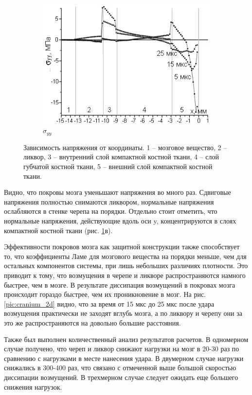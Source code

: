 \begin{figure}[h]
\begin{subfigure}[b]{0.6\textwidth}
\includegraphics[width=\textwidth]{png/cranium/2d-syy-1d.png}
\caption{$\sigma_{yy}$}
\end{subfigure}
\caption{Зависимость напряжения от координаты. 1 -- мозговое вещество, 2 -- ликвор, 3 -- внутренний слой компактной костной ткани, 4 -- слой губчатой костной ткани, 5 -- внешний слой компактной костной ткани.}
\label{pic:cranium_2d_1d}
\end{figure}

Видно, что покровы мозга уменьшают напряжения во много раз. Сдвиговые напряжения полностью снимаются ликвором, нормальные напряжения ослабляются в стенке черепа на порядки. Отдельно стоит отметить, что нормальные напряжения, действующие вдоль оси y, концентрируются в слоях компактной костной ткани (рис. \ref{pic:cranium_2d_1d}в).

Эффективности покровов мозга как защитной конструкции также способствует то, что коэффициенты Ламе для мозгового вещества на порядки меньше, чем для остальных компонентов системы, при лишь небольших различиях плотности. Это приводит к тому, что возмущения в черепе и ликворе распространяются намного быстрее, чем в мозге. В результате диссипация возмущений в покровах мозга происходит гораздо быстрее, чем их проникновение в мозг. На рис. \ref{pic:cranium_2d} видно, что за время от 15 мкс до 25 мкс после удара возмущения практически не заходят вглубь мозга, а по ликвору и черепу они за это же распространяются на довольно большие расстояния.

Также был выполнен количественный анализ результатов расчетов. В одномерном случае получено, что череп и ликвор снижают нагрузки на мозг в 20-30 раз по сравнению с нагрузками в месте нанесения удара. В двумерном случае нагрузки снижались в 300-400 раз, что связано с отмеченной выше большой скоростью диссипации возмущений. В трехмерном случае следует ожидать еще большего снижения нагрузок. 

